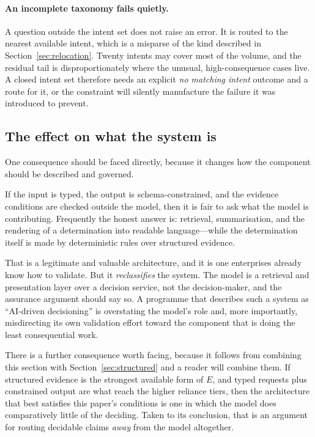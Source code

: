 \documentclass[11pt]{article}
\theoremstyle{plain}
\theoremstyle{definition}
\begin{document}
\paragraph{An incomplete taxonomy fails quietly.} A question outside the intent set
does not raise an error. It is routed to the nearest available intent, which is a
misparse of the kind described in Section~\ref{sec:relocation}. Twenty intents may
cover most of the volume, and the residual tail is disproportionately where the
unusual, high-consequence cases live. A closed intent set therefore needs an explicit
\emph{no matching intent} outcome and a route for it, or the constraint will silently
manufacture the failure it was introduced to prevent.

\subsection{The effect on what the system is}

One consequence should be faced directly, because it changes how the component should
be described and governed.

If the input is typed, the output is schema-constrained, and the evidence conditions
are checked outside the model, then it is fair to ask what the model is contributing.
Frequently the honest answer is: retrieval, summarisation, and the rendering of a
determination into readable language---while the determination itself is made by
deterministic rules over structured evidence.

That is a legitimate and valuable architecture, and it is one enterprises already know
how to validate. But it \emph{reclassifies} the system. The model is a retrieval and
presentation layer over a decision service, not the decision-maker, and the assurance
argument should say so. A programme that describes such a system as ``AI-driven
decisioning'' is overstating the model's role and, more importantly, misdirecting its
own validation effort toward the component that is doing the least consequential work.

There is a further consequence worth facing, because it follows from combining this
section with Section~\ref{sec:structured} and a reader will combine them. If structured
evidence is the strongest available form of $E$, and typed requests plus constrained
output are what reach the higher reliance tiers, then the architecture that best
satisfies this paper's conditions is one in which the model does comparatively little of
the deciding. Taken to its conclusion, that is an argument for routing decidable claims
\emph{away} from the model altogether.
\end{document}
